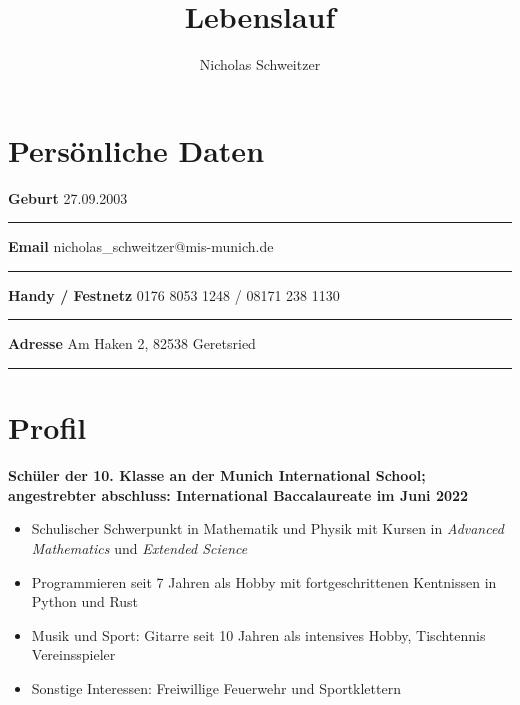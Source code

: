 \documentclass[12pt]{article}
\title{\vspace{-96pt}\Huge Lebenslauf}
\author{\Huge Nicholas Schweitzer}
\date{}
\newcommand{\sect}[1]{
  {
    \vspace{6pt}
    \section*{
      \fontsize{18}{0}\selectfont
      \hspace{-12pt}
      \vspace{-12pt}
      #1
    }
  }
}
\newcommand{\sep}{{\color{gray}\vspace{-12pt}\hrule}}
\begin{document}
\maketitle
\vspace{-32pt}


\sect{Pers{\"o}nliche Daten}

\textbf{Geburt} \hfill{27.09.2003} \, \\
\sep
\textbf{Email} \hfill{nicholas\_schweitzer@mis-munich.de} \, \\
\sep
\textbf{Handy / Festnetz} \hfill{0176 8053 1248 / 08171 238 1130} \, \\
\sep
\textbf{Adresse} \hfill{Am Haken 2, 82538 Geretsried \, }\\
\sep

\sect{Profil}

\textbf{Sch{\"u}ler der 10. Klasse an der Munich International School; angestrebter
  abschluss: International Baccalaureate im Juni 2022}

\begin{itemize}
  \itemsep0pt

\item Schulischer Schwerpunkt in Mathematik und Physik mit Kursen in \textit{\glqq
  Advanced Mathematics\grqq} und \textit{\glqq Extended Science\grqq}

\item Programmieren seit 7 Jahren als Hobby mit fortgeschrittenen Kentnissen in
  Python und Rust

\item Musik und Sport: Gitarre seit 10 Jahren als intensives Hobby,
  Tischtennis Vereinsspieler

\item Sonstige Interessen: Freiwillige Feuerwehr und Sportklettern

\end{itemize}
\vspace{-24pt}
\end{document}
